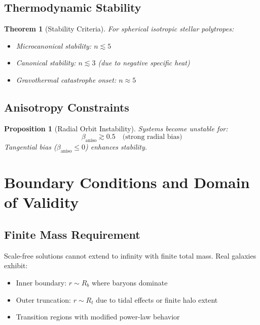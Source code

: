 \documentclass[12pt, a4paper]{article}
\newtheorem{theorem}{Theorem}
\newtheorem{proposition}{Proposition}
\theoremstyle{definition}
\theoremstyle{remark}
\begin{document}
\subsection{Thermodynamic Stability}

\begin{theorem}[Stability Criteria]
For spherical isotropic stellar polytropes:
\begin{itemize}
\item Microcanonical stability: $n \lesssim 5$
\item Canonical stability: $n \lesssim 3$ (due to negative specific heat)
\item Gravothermal catastrophe onset: $n \approx 5$ \cite{Chavanis2002}
\end{itemize}
\end{theorem}

\subsection{Anisotropy Constraints}

\begin{proposition}[Radial Orbit Instability]
Systems become unstable for:
\begin{equation}
\beta_{\text{aniso}} \gtrsim 0.5 \quad \text{(strong radial bias)}
\end{equation}
Tangential bias ($\beta_{\text{aniso}} \leq 0$) enhances stability.
\end{proposition}

\section{Boundary Conditions and Domain of Validity}

\subsection{Finite Mass Requirement}

Scale-free solutions cannot extend to infinity with finite total mass. Real galaxies exhibit:
\begin{itemize}
\item Inner boundary: $r \sim R_b$ where baryons dominate
\item Outer truncation: $r \sim R_t$ due to tidal effects or finite halo extent
\item Transition regions with modified power-law behavior
\end{itemize}
\end{document}
